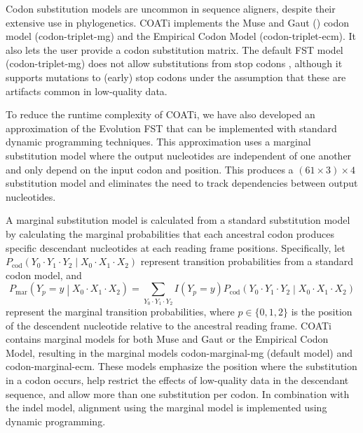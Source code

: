 Codon substitution models are uncommon in sequence aligners, despite their extensive use in phylogenetics.
COATi implements the Muse and Gaut (\citeyear{muse_gaut_1994}) codon model (codon-triplet-mg) and the Empirical Codon Model  (codon-triplet-ecm).
It also lets the user provide a codon substitution matrix.
The default FST model (codon-triplet-mg) does not allow substitutions from stop codons , although it supports mutations to (early) stop codons under the assumption that these are artifacts common in low-quality data.

To reduce the runtime complexity of COATi, we have also developed an approximation of the Evolution FST that can be implemented with standard dynamic programming techniques. This approximation uses a marginal substitution model where the output nucleotides are independent of one another and only depend on the input codon and position. This produces a $\left(61 \times 3 \right) \times 4$ substitution model and eliminates the need to track dependencies between output nucleotides.

A marginal substitution model is calculated from a standard substitution model by calculating the marginal probabilities that each ancestral codon produces specific descendant nucleotides at each reading frame positions.
%
Specifically, let
$P_\text{cod}\left(Y_0 \cdot Y_1 \cdot Y_2 \middle| X_0 \cdot X_1 \cdot X_2\right)$ represent transition probabilities from a standard codon model, and
%
\[
P_\text{mar}\left(Y_p = y \middle| X_0 \cdot X_1 \cdot X_2\right) =
\sum_{Y_0 \cdot Y_1 \cdot Y_2} I(Y_p = y) P_\text{cod}\left(Y_0 \cdot Y_1 \cdot Y_2 \middle| X_0 \cdot X_1 \cdot X_2\right)
\]
%
represent the marginal transition probabilities, where
$p \in \{0, 1, 2\}$ is the position of the descendent nucleotide relative to the ancestral reading frame.
COATi contains marginal models for both Muse and Gaut or the Empirical Codon Model, resulting in the marginal models codon-marginal-mg (default model) and codon-marginal-ecm.
These models emphasize the position where the substitution in a codon occurs, help restrict the effects of low-quality data in the descendant sequence, and allow more than one substitution per codon.
In combination with the indel model, alignment using the marginal model is implemented using dynamic programming.
